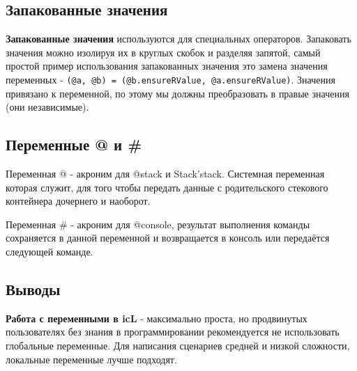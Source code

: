 \subsection{Запакованные значения}

{\bf Запакованные значения} используются для специальных операторов. Запаковать значения можно изолируя их в круглых скобок и разделяя запятой, самый простой пример использования запакованных значения это замена значения переменных - \texttt{(@a, @b) = (@b.ensureRValue, @a.ensureRValue)}. Значения привязано к переменной, по этому мы должны преобразовать в правые значения (они независимые).

\subsection{Переменные @ и \#}

{Переменная @} - акроним для @stack и Stack'stack. Системная переменная которая служит, для того чтобы передать данные с родительского стекового контейнера дочернего и наоборот. 

{Переменная \#} - акроним для @console, результат выполнения команды сохраняется в данной переменной и возвращается в консоль или передаётся следующей команде.

\subsection{Выводы}

{\bf Работа с переменными в icL} - максимально проста, но продвинутых пользователях без знания в программировании рекомендуется не использовать глобальные переменные. Для написания сценариев средней и низкой сложности, локальные переменные лучше подходят.
